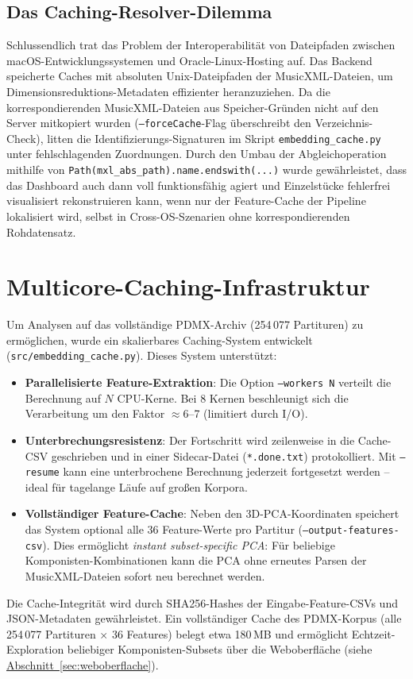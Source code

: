 \documentclass[10pt,a4paper]{article}
\theoremstyle{definition}
\begin{document}
\subsection{Das Caching-Resolver-Dilemma}\label{sec:caching}
Schlussendlich trat das Problem der Interoperabilität von Dateipfaden zwischen macOS-Entwicklungssystemen und Oracle-Linux-Hosting auf. Das Backend speicherte Caches mit absoluten Unix-Dateipfaden der MusicXML-Dateien, um Dimensionsreduktions-Metadaten effizienter heranzuziehen. Da die korrespondierenden MusicXML-Dateien aus Speicher-Gründen nicht auf den Server mitkopiert wurden (\texttt{--forceCache}-Flag überschreibt den Verzeichnis-Check), litten die Identifizierungs-Signaturen im Skript \texttt{embedding\_cache.py} unter fehlschlagenden Zuordnungen. Durch den Umbau der Abgleichoperation mithilfe von \texttt{Path(mxl\_abs\_path).name.endswith(...)} wurde gewährleistet, dass das Dashboard auch dann voll funktionsfähig agiert und Einzelstücke fehlerfrei visualisiert rekonstruieren kann, wenn nur der Feature-Cache der Pipeline lokalisiert wird, selbst in Cross-OS-Szenarien ohne korrespondierenden Rohdatensatz.


\section{Multicore-Caching-Infrastruktur}\label{app:F}
Um Analysen auf das vollständige PDMX-Archiv (254\,077 Partituren) zu ermöglichen, wurde ein skalierbares Caching-System entwickelt (\texttt{src/embedding\_cache.py}). Dieses System unterstützt:
\begin{itemize}
    \item \textbf{Parallelisierte Feature-Extraktion}: Die Option \texttt{--workers N} verteilt die Berechnung auf $N$ CPU-Kerne. Bei 8 Kernen beschleunigt sich die Verarbeitung um den Faktor $\approx$6--7 (limitiert durch I/O).
    \item \textbf{Unterbrechungsresistenz}: Der Fortschritt wird zeilenweise in die Cache-CSV geschrieben und in einer Sidecar-Datei (\texttt{*.done.txt}) protokolliert. Mit \texttt{--resume} kann eine unterbrochene Berechnung jederzeit fortgesetzt werden -- ideal für tagelange Läufe auf großen Korpora.
    \item \textbf{Vollständiger Feature-Cache}: Neben den 3D-PCA-Koordinaten speichert das System optional alle 36 Feature-Werte pro Partitur (\texttt{--output-features-csv}). Dies ermöglicht \textit{instant subset-specific PCA}: Für beliebige Komponisten-Kombinationen kann die PCA ohne erneutes Parsen der MusicXML-Dateien sofort neu berechnet werden.
\end{itemize}

\noindent Die Cache-Integrität wird durch SHA256-Hashes der Eingabe-Feature-CSVs und JSON-Metadaten gewährleistet. Ein vollständiger Cache des PDMX-Korpus (alle 254\,077 Partituren $\times$ 36 Features) belegt etwa 180\,MB und ermöglicht Echtzeit-Exploration beliebiger Komponisten-Subsets über die Weboberfläche (siehe \hyperref[sec:weboberflache]{Abschnitt~\ref*{sec:weboberflache}}).
\end{document}
